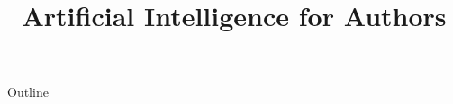 \documentclass[xcolor=dvipsnames,compress,t,pdf,notes,9pt]{beamer}
\title[\insertframenumber /\inserttotalframenumber]{Artificial Intelligence for Authors}
\begin{document}
	\begin{frame}
	\titlepage
	\end{frame}

	\begin{frame}{Outline}
	    \tableofcontents
	\end{frame}

	
	
	
\end{document}
